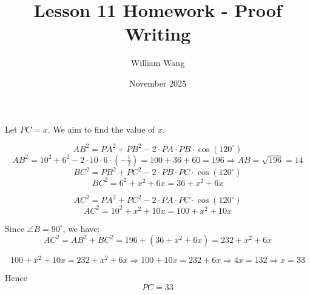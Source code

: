 \documentclass{article}
\title{Lesson 11 Homework - Proof Writing}
\author{William Wang}
\date{November 2025}
\begin{document}
\maketitle

\section{}

Let \( PC = x \). We aim to find the value of \( x \).

\[
AB^2 = PA^2 + PB^2 - 2 \cdot PA \cdot PB \cdot \cos(120^\circ)
\]
\[
AB^2 = 10^2 + 6^2 - 2 \cdot 10 \cdot 6 \cdot (-\tfrac{1}{2}) = 100 + 36 + 60 = 196
\Rightarrow AB = \sqrt{196} = 14
\]
\[
BC^2 = PB^2 + PC^2 - 2 \cdot PB \cdot PC \cdot \cos(120^\circ)
\]
\[
BC^2 = 6^2 + x^2 + 6x = 36 + x^2 + 6x
\]

\[
AC^2 = PA^2 + PC^2 - 2 \cdot PA \cdot PC \cdot \cos(120^\circ)
\]
\[
AC^2 = 10^2 + x^2 + 10x = 100 + x^2 + 10x
\]


Since \( \angle B = 90^\circ \), we have:
\[
AC^2 = AB^2 + BC^2 = 196 + (36 + x^2 + 6x) = 232 + x^2 + 6x
\]



\[
100 + x^2 + 10x = 232 + x^2 + 6x
\Rightarrow 100 + 10x = 232 + 6x
\Rightarrow 4x = 132
\Rightarrow x = 33
\]

Hence
\[PC = 33\]
\end{document}
